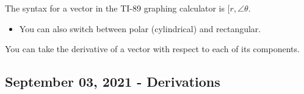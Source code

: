 \documentclass{scrreprt} %
\begin{document}
\begin{remark}
  The syntax for a vector in the TI-89 graphing calculator is 
  $[r,\angle \theta $. 

  \begin{itemize}
    \item You can also switch between polar (cylindrical) and rectangular.
  \end{itemize}
\end{remark}

\begin{remark}
  You can take the derivative of a vector with respect to each of its components.
\end{remark}

\subsection{September 03, 2021 - Derivations}

\begin{example}
  $$\Delta y = v_0t + \frac{1}{2}at^2$$
  $$t = \frac{x}{v_0cos(\theta)}$$
  $$y = \frac{v_0\sin(\theta)x}{v_0\cos(\theta) - \frac{gx^2}{2v_0^2cos^2\(theta)}$$
  $$y = \tan(\theta)x - \frac{gx}{2v_0^2cos^2(\theta)}
\end{example}
\end{document}
